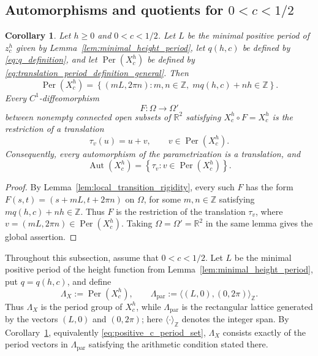 \documentclass[a4paper,11pt]{amsart}
\numberwithin{equation}{section}
\theoremstyle{plain}
\newtheorem{coro}[thm]{Corollary}
\begin{document}
\subsection{Automorphisms and quotients for \texorpdfstring{$0<c<1/2$}{0<c<1/2}}

\begin{coro}
\label{cor:positive_c_symmetry_group}
Let $h\geq0$ and $0<c<1/2$. Let $L$ be the minimal positive period of $z_c^h$ given
by Lemma~\ref{lem:minimal_height_period}, let $q(h,c)$ be defined by
\eqref{eq:q_definition}, and let $\operatorname{Per}(X_c^h)$ be defined
by \eqref{eq:translation_period_definition_general}. Then
\begin{equation}\label{eq:positive_c_period_set}
\operatorname{Per}(X_c^h)
=
\left\{
(mL,2\pi n):
 m,n\in\mathbb Z,\;
 mq(h,c)+nh\in\mathbb Z
\right\}.
\end{equation}
Every $C^1$-diffeomorphism
\[
F:\Omega\longrightarrow\Omega'
\]
between nonempty connected open subsets of $\mathbb R^2$ satisfying
$X_c^h\circ F=X_c^h$ is the restriction of a translation
\[
\tau_v(u)=u+v,
\qquad
v\in\operatorname{Per}(X_c^h).
\]
Consequently, every automorphism of the parametrization is a translation, and
\begin{equation}\label{eq:positive_c_automorphism_group}
\operatorname{Aut}(X_c^h)
=
\left\{\tau_v:v\in\operatorname{Per}(X_c^h)\right\}.
\end{equation}
\end{coro}

\begin{proof}
By Lemma~\ref{lem:local_transition_rigidity}, every such $F$ has the form
$F(s,t)=(s+mL,t+2\pi n)$ on $\Omega$, for some
$m,n\in\mathbb Z$ satisfying $mq(h,c)+nh\in\mathbb Z$. Thus $F$
is the restriction of the translation
$\tau_v$, where $v=(mL,2\pi n)\in\operatorname{Per}(X_c^h)$.
Taking $\Omega=\Omega'=\mathbb R^2$ in the same lemma gives the global
assertion.
\end{proof}

Throughout this subsection, assume that $0<c<1/2$. Let $L$ be the
minimal positive period of the height function from
Lemma~\ref{lem:minimal_height_period}, put $q=q(h,c)$, and define
\begin{equation}\label{eq:translation_period_set}
\Lambda_X:=\operatorname{Per}(X_c^h),
\qquad
\Lambda_{\mathrm{par}}:=\langle(L,0),(0,2\pi)\rangle_{\mathbb Z}.
\end{equation}
Thus $\Lambda_X$ is the period group of $X_c^h$, while
$\Lambda_{\mathrm{par}}$ is the rectangular lattice generated by the vectors
$(L,0)$ and $(0,2\pi)$; here
$\langle\cdot\rangle_{\mathbb Z}$ denotes the integer span.
By Corollary~\ref{cor:positive_c_symmetry_group}, equivalently
\eqref{eq:positive_c_period_set}, $\Lambda_X$ consists exactly of the
period vectors in $\Lambda_{\mathrm{par}}$ satisfying the arithmetic
condition stated there.
\end{document}
